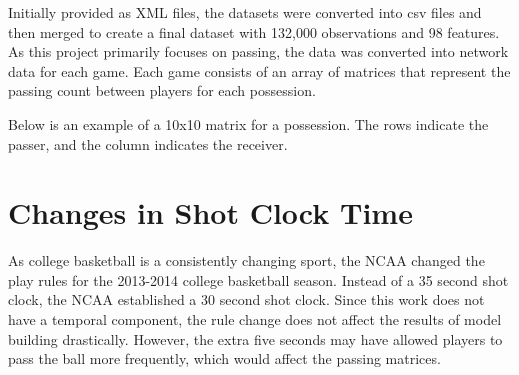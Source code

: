 \documentclass[12pt,twoside]{dukestatscithesis}
\theoremstyle{definition}
\theoremstyle{definition}
\theoremstyle{definition}
\theoremstyle{remark}
\begin{document}
Initially provided as XML files, the datasets were converted into csv
files and then merged to create a final dataset with 132,000
observations and 98 features. As this project primarily focuses on
passing, the data was converted into network data for each game. Each
game consists of an array of matrices that represent the passing count
between players for each possession.

Below is an example of a 10x10 matrix for a possession. The rows
indicate the passer, and the column indicates the receiver.
\begin{table}[H]
\centering\begingroup\fontsize{6}{8}\selectfont
\begin{table}[H]
\centering
{}
\end{table}\endgroup{}
\end{table}
\section{Changes in Shot Clock Time}\label{changes-in-shot-clock-time}

As college basketball is a consistently changing sport, the NCAA changed
the play rules for the 2013-2014 college basketball season. Instead of a
35 second shot clock, the NCAA established a 30 second shot clock. Since
this work does not have a temporal component, the rule change does not
affect the results of model building drastically. However, the extra
five seconds may have allowed players to pass the ball more frequently,
which would affect the passing matrices.
\end{document}
